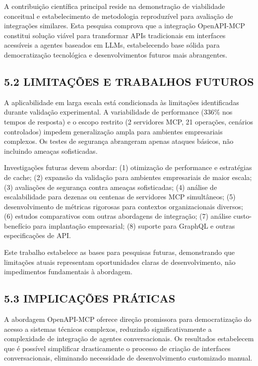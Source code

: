 \documentclass[
]{article}
\begin{document}
A contribuição científica principal reside na demonstração de
viabilidade conceitual e estabelecimento de metodologia reproduzível
para avaliação de integrações similares. Esta pesquisa comprova que a
integração OpenAPI-MCP constitui solução viável para transformar APIs
tradicionais em interfaces acessíveis a agentes baseados em LLMs,
estabelecendo base sólida para democratização tecnológica e
desenvolvimentos futuros mais abrangentes.

\subsection{5.2 LIMITAÇÕES E TRABALHOS
FUTUROS}\label{limitauxe7uxf5es-e-trabalhos-futuros}

A aplicabilidade em larga escala está condicionada às limitações
identificadas durante validação experimental. A variabilidade de
performance (336\% nos tempos de resposta) e o escopo restrito (2
servidores MCP, 21 operações, cenários controlados) impedem
generalização ampla para ambientes empresariais complexos. Os testes de
segurança abrangeram apenas ataques básicos, não incluindo ameaças
sofisticadas.

Investigações futuras devem abordar: (1) otimização de performance e
estratégias de cache; (2) expansão da validação para ambientes
empresariais de maior escala; (3) avaliações de segurança contra ameaças
sofisticadas; (4) análise de escalabilidade para dezenas ou centenas de
servidores MCP simultâneos; (5) desenvolvimento de métricas rigorosas
para contextos organizacionais diversos; (6) estudos comparativos com
outras abordagens de integração; (7) análise custo-benefício para
implantação empresarial; (8) suporte para GraphQL e outras
especificações de API.

Este trabalho estabelece as bases para pesquisas futuras, demonstrando
que limitações atuais representam oportunidades claras de
desenvolvimento, não impedimentos fundamentais à abordagem.

\subsection{5.3 IMPLICAÇÕES
PRÁTICAS}\label{implicauxe7uxf5es-pruxe1ticas}

A abordagem OpenAPI-MCP oferece direção promissora para democratização
do acesso a sistemas técnicos complexos, reduzindo significativamente a
complexidade de integração de agentes conversacionais. Os resultados
estabelecem que é possível simplificar drasticamente o processo de
criação de interfaces conversacionais, eliminando necessidade de
desenvolvimento customizado manual.
\end{document}
